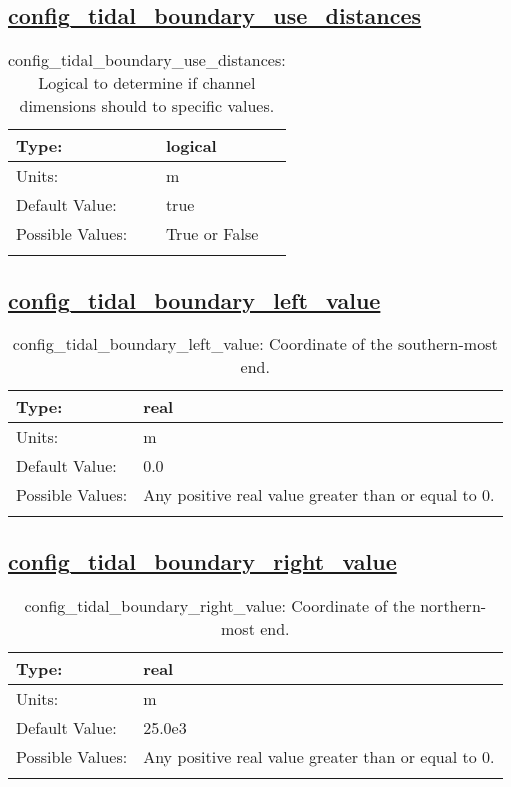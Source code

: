\subsection[config\_tidal\_boundary\_use\_distances]{\hyperref[sec:nm_tab_tidal_boundary]{config\_tidal\_boundary\_use\_distances}}
\label{subsec:nm_sec_config_tidal_boundary_use_distances}
\begin{center}
\begin{longtable}{| p{2.0in} || p{4.0in} |}
    \hline
    Type: & logical \\
    \hline
    Units: & \si{m} \\
    \hline
    Default Value: & true \\
    \hline
    Possible Values: & True or False \\
    \hline
    \caption{config\_tidal\_boundary\_use\_distances: Logical to determine if channel dimensions should to specific values.}
\end{longtable}
\end{center}
\subsection[config\_tidal\_boundary\_left\_value]{\hyperref[sec:nm_tab_tidal_boundary]{config\_tidal\_boundary\_left\_value}}
\label{subsec:nm_sec_config_tidal_boundary_left_value}
\begin{center}
\begin{longtable}{| p{2.0in} || p{4.0in} |}
    \hline
    Type: & real \\
    \hline
    Units: & \si{m} \\
    \hline
    Default Value: & 0.0 \\
    \hline
    Possible Values: & Any positive real value greater than or equal to 0. \\
    \hline
    \caption{config\_tidal\_boundary\_left\_value: Coordinate of the southern-most end.}
\end{longtable}
\end{center}
\subsection[config\_tidal\_boundary\_right\_value]{\hyperref[sec:nm_tab_tidal_boundary]{config\_tidal\_boundary\_right\_value}}
\label{subsec:nm_sec_config_tidal_boundary_right_value}
\begin{center}
\begin{longtable}{| p{2.0in} || p{4.0in} |}
    \hline
    Type: & real \\
    \hline
    Units: & \si{m} \\
    \hline
    Default Value: & 25.0e3 \\
    \hline
    Possible Values: & Any positive real value greater than or equal to 0. \\
    \hline
    \caption{config\_tidal\_boundary\_right\_value: Coordinate of the northern-most end.}
\end{longtable}
\end{center}
